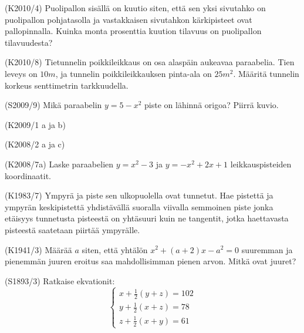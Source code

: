 \begin{tehtava}(K2010/4)
Puolipallon sisällä on kuutio siten, että sen yksi sivutahko on puolipallon pohjatasolla ja vastakkaisen sivutahkon kärkipisteet ovat pallopinnalla. Kuinka monta prosenttia kuution tilavuus on puolipallon tilavuudesta?
\end{tehtava}

\begin{tehtava}(K2010/8)
Tietunnelin poikkileikkaus on osa alaspäin aukeavaa paraabelia. Tien leveys on $10 m$, ja tunnelin poikkileikkauksen pinta-ala on $25 m^2$. Määritä tunnelin korkeus senttimetrin tarkkuudella.
\end{tehtava}


\begin{tehtava}(S2009/9)
Mikä paraabelin $y=5-x^2$ piste on lähinnä origoa? Piirrä kuvio.
\end{tehtava}

\begin{tehtava}(K2009/1 a ja b)
  \begin{alakohdat}
  \end{alakohdat}
\end{tehtava}

\begin{tehtava} (K2008/2 a ja c)
  \begin{alakohdat}
  \end{alakohdat}
\end{tehtava}


\begin{tehtava}(K2008/7a)
Laske paraabelien $y=x^2-3$ ja $y=-x^2+2x+1$ leikkauspisteiden koordinaatit.
\end{tehtava}

\begin{tehtava}(K1983/7)
Ympyrä ja piste sen ulkopuolella ovat tunnetut. Hae pistettä ja ympyrän keskipistettä yhdistävällä suoralla viivalla semmoinen piste jonka etäisyys tunnetusta pisteestä on yhtäsuuri kuin ne tangentit, jotka haettavasta pisteestä saatetaan piirtää ympyrälle. 
\end{tehtava}


\begin{tehtava}(K1941/3)
Määrää $a$ siten, että yhtälön $x^2+(a+2)x-a^2=0$ suuremman ja pienemmän juuren eroitus saa mahdollisimman pienen arvon. Mitkä ovat juuret? 
\end{tehtava}


\begin{tehtava}(S1893/3)
Ratkaise ekvationit:
\[
\left\{
\begin{aligned}
 x+\frac{1}{2}(y+z)=102    \\
 y+\frac{1}{2}(x+z)=78  \\
 z+\frac{1}{2}(x+y)=61
\end{aligned}
\right. 
\]
\end{tehtava}

